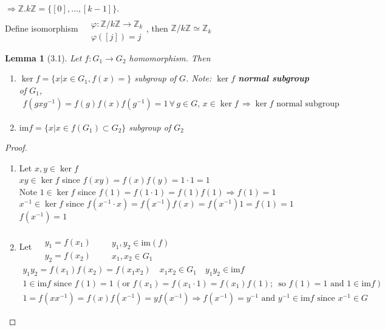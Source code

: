 \documentclass{book}
\newtheorem{lemma}{Lemma}
\begin{document}
$\Longrightarrow \mathbb{Z}. k \mathbb{Z} = \lbrace [0], \dots, [k-1] \rbrace$.  \\
Define isomorphism $\begin{aligned} & \quad \\ 
  & \varphi : \mathbb{Z}/ k\mathbb{Z} \to \mathbb{Z}_k \\
  & \varphi([j]) = j \end{aligned}$, then $\mathbb{Z}/ k\mathbb{Z} \simeq \mathbb{Z}_k$  

\begin{lemma}[3.1] Let $f:G_1 \to G_2$ homomorphism.  Then
\begin{enumerate}
\item[(a)] $\ker{f} = \lbrace x | x \in G_1, f(x) = \rbrace$ subgroup of $G$.  Note: $\ker{f}$ \textbf{normal subgroup} of $G_1$, \\
$\begin{gathered}
  f(gxg^{-1}) = f(g)f(x) f(g^{-1}) = 1 \, \forall \, g \in G, \, x\in \ker{f}  \, \Longrightarrow \ker{f} \text{ normal subgroup }
\end{gathered}$
\item[(b)] $\text{im}{f} = \lbrace x | x \in f(G_1) \subset G_2 \rbrace$ subgroup of $G_2$
\end{enumerate}
\end{lemma}

\begin{proof}
\begin{enumerate}
\item[(a)] Let $x,y \in \ker{f}$ \\
$xy \in \ker{f}$ since $f(xy) = f(x) f(y) = 1\cdot 1 = 1$ \\
Note $1 \in \ker{f}$ since $f(1) = f(1\cdot 1 ) = f(1) f(1) \Longrightarrow f(1) = 1$ \\
$x^{-1} \in \ker{f}$ since $f(x^{-1}\cdot x) = f(x^{-1})f(x) = f(x^{-1}) 1 = f(1) = 1$ \, $f(x^{-1})= 1$
\item[(b)] Let $\begin{aligned} & \quad \\ 
  & y_1 = f(x_1) \\ 
  & y_2  = f(x_2) \end{aligned}$ \quad \, $\begin{aligned} & \quad \\ 
  & y_1,y_2 \in \text{im}(f) \\
  & x_1, x_2 \in G_1 \end{aligned}$ \quad \, \\
$\begin{gathered}
  y_1 y_2 = f(x_1) f(x_2) = f(x_1x_2) \quad x_1 x_2 \in G_1 \quad y_1 y_2 \in \text{im}{f} \\
  1 \in \text{im}{f} \text{ since } f(1) = 1 \, (\text{or } f(x_1) = f(x_1 \cdot 1) = f(x_1) f(1); \, \text{ so } f(1) = 1 \text{ and } 1 \in \text{im}{f}) \\ 
  1 = f(xx^{-1}) = f(x) f(x^{-1}) = yf(x^{-1}) \Longrightarrow f(x^{-1}) = y^{-1} \text{ and } y^{-1} \in \text{im}{f} \text{ since } x^{-1} \in G 
\end{gathered}$
\end{enumerate}
\end{proof}
\end{document}
